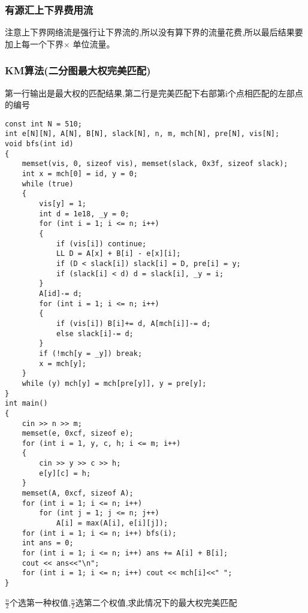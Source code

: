 \documentclass[a4paper,fontset=none]{ctexart}
\begin{document}
\subsubsection{有源汇上下界费用流}

注意上下界网络流是强行让下界流的,所以没有算下界的流量花费,所以最后结果要加上每一个下界$\times$ 单位流量。
\subsubsection{KM算法(二分图最大权完美匹配)}

第一行输出是最大权的匹配结果,第二行是完美匹配下右部第i个点相匹配的左部点的编号

\begin{verbatim}
const int N = 510;
int e[N][N], A[N], B[N], slack[N], n, m, mch[N], pre[N], vis[N];
void bfs(int id)
{
    memset(vis, 0, sizeof vis), memset(slack, 0x3f, sizeof slack);
    int x = mch[0] = id, y = 0;
    while (true)
    {
        vis[y] = 1;
        int d = 1e18, _y = 0;
        for (int i = 1; i <= n; i++)
        {
            if (vis[i]) continue;
            LL D = A[x] + B[i] - e[x][i];
            if (D < slack[i]) slack[i] = D, pre[i] = y;
            if (slack[i] < d) d = slack[i], _y = i;
        }
        A[id]-= d;
        for (int i = 1; i <= n; i++)
        {
            if (vis[i]) B[i]+= d, A[mch[i]]-= d;
            else slack[i]-= d;
        }
        if (!mch[y = _y]) break;
        x = mch[y];
    }
    while (y) mch[y] = mch[pre[y]], y = pre[y];
}
int main()
{
    cin >> n >> m;
    memset(e, 0xcf, sizeof e);
    for (int i = 1, y, c, h; i <= m; i++)
    {
        cin >> y >> c >> h;
        e[y][c] = h;
    }
    memset(A, 0xcf, sizeof A);
    for (int i = 1; i <= n; i++)
        for (int j = 1; j <= n; j++)
            A[i] = max(A[i], e[i][j]);
    for (int i = 1; i <= n; i++) bfs(i);
    int ans = 0;
    for (int i = 1; i <= n; i++) ans += A[i] + B[i];
    cout << ans<<"\n";
    for (int i = 1; i <= n; i++) cout << mch[i]<<" ";
}
\end{verbatim}

$\frac{n}{2}$个选第一种权值,$\frac{n}{2}$选第二个权值,求此情况下的最大权完美匹配
\end{document}
